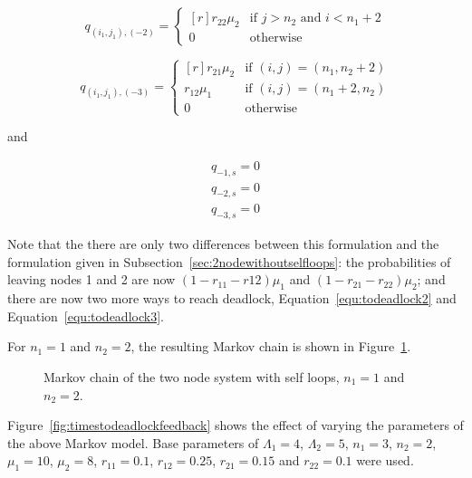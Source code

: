 \documentclass{article}
\begin{document}
\begin{equation}\label{equ:todeadlock3}
  q_{(i_1, j_1), (-2)} = \left\{
  \begin{matrix*}[ r ]
    r_{22}\mu_2 & \text{if } j > n_2 \text{ and } i < n_1 + 2 \\
    0 & \text{otherwise}
  \end{matrix*}
  \right.
\end{equation}

\begin{equation}
  q_{(i_1, j_1), (-3)} = \left\{
  \begin{matrix*}[ r ]
    r_{21}\mu_2 & \text{if } (i, j) = (n_1, n_2 + 2) \\
    r_{12}\mu_1 & \text{if } (i, j) = (n_1 + 2, n_2) \\
    0 & \text{otherwise}
  \end{matrix*}
  \right.
\end{equation}

and

\begin{align}
  q_{-1, s} = 0 \\
  q_{-2, s} = 0 \\
  q_{-3, s} = 0
\end{align}

Note that the there are only two differences between this formulation and the formulation given in Subsection~\ref{sec:2nodewithoutselfloops}: the probabilities of leaving nodes 1 and 2 are now $(1-r_{11}-r{12})\mu_1$ and $(1-r_{21}-r_{22})\mu_2$; and there are now two more ways to reach deadlock, Equation~\ref{equ:todeadlock2} and Equation~\ref{equ:todeadlock3}.

For $n_1 = 1$ and $n_2 = 2$, the resulting Markov chain is shown in Figure~\ref{fig:2nodeMCfeedback}.

\begin{figure}[!htbp]
    
    \caption{Markov chain of the two node system with self loops, $n_1=1$ and $n_2=2$.}
    \label{fig:2nodeMCfeedback}
\end{figure}

Figure~\ref{fig:timestodeadlockfeedback} shows the effect of varying the parameters of the above Markov model.
Base parameters of $\Lambda_1 = 4$, $\Lambda_2 = 5$, $n_1 = 3$, $n_2 = 2$, $\mu_1 = 10$, $\mu_2 = 8$, $r_{11} = 0.1$, $r_{12} = 0.25$, $r_{21} = 0.15$ and $r_{22} = 0.1$ were used.
\end{document}
